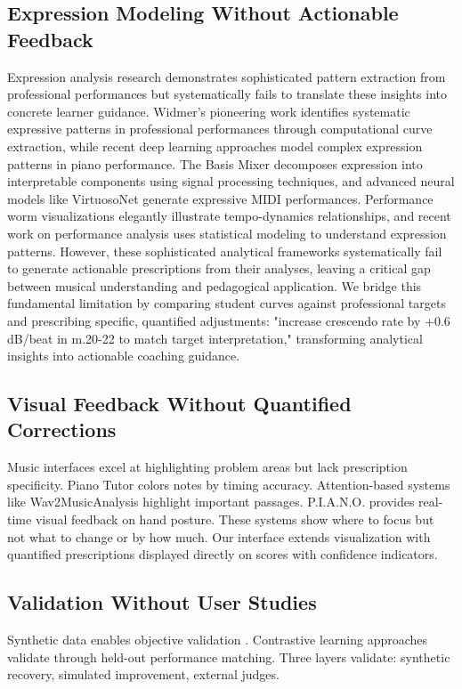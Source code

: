\subsection{Expression Modeling Without Actionable Feedback}
Expression analysis research demonstrates sophisticated pattern extraction from professional performances but systematically fails to translate these insights into concrete learner guidance.
Widmer's pioneering work \cite{widmer2003} identifies systematic expressive patterns in professional performances through computational curve extraction, while recent deep learning approaches \cite{jeong2019} model complex expression patterns in piano performance.
The Basis Mixer \cite{giraldo2019} decomposes expression into interpretable components using signal processing techniques, and advanced neural models like VirtuosoNet \cite{jeong2019} generate expressive MIDI performances.
Performance worm visualizations \cite{goebl2008} elegantly illustrate tempo-dynamics relationships, and recent work on performance analysis \cite{cancino2018} uses statistical modeling to understand expression patterns.
However, these sophisticated analytical frameworks systematically fail to generate actionable prescriptions from their analyses, leaving a critical gap between musical understanding and pedagogical application.
We bridge this fundamental limitation by comparing student curves against professional targets and prescribing specific, quantified adjustments: "increase crescendo rate by +0.6 dB/beat in m.20-22 to match target interpretation," transforming analytical insights into actionable coaching guidance.

\subsection{Visual Feedback Without Quantified Corrections}
Music interfaces excel at highlighting problem areas but lack prescription specificity.
Piano Tutor \cite{dannenberg2013} colors notes by timing accuracy.
Attention-based systems like Wav2MusicAnalysis \cite{kawamura2021uist} highlight important passages.
P.I.A.N.O. \cite{oshima2021} provides real-time visual feedback on hand posture.
These systems show where to focus but not what to change or by how much.
Our interface extends visualization with quantified prescriptions displayed directly on scores with confidence indicators.

\subsection{Validation Without User Studies}
Synthetic data enables objective validation \cite{giraldo2019}.
Contrastive learning approaches validate through held-out performance matching.
Three layers validate: synthetic recovery, simulated improvement, external judges.


